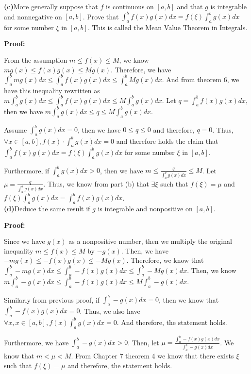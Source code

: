 \documentclass[a4paper,12pt]{report}
\begin{document}
\noindent
\textbf{(c)}More generally suppose that $f$ is continuous on $[a,b]$ and that $g$ is integrable and nonnegative on $[a,b]$. Prove that $\int_a^bf(x)g(x)dx=f(\xi)\int_a^bg(x)dx$ for some number $\xi$ in $[a,b]$. This is called the Mean Value Theorem in Integrals. 

\noindent
\textbf{Proof: }

\noindent
From the assumption $m\leq f(x)\leq M$, we know $mg(x)\leq f(x)g(x)\leq Mg(x)$. Therefore, we have $\int_a^bmg(x)dx\leq  \int_a^bf(x)g(x)dx \leq \int_a^bMg(x)dx$. And from theorem 6, we have this inequality rewritten as $m\int_a^bg(x)dx\leq  \int_a^bf(x)g(x)dx \leq M\int_a^bg(x)dx$. Let $q =\int_a^bf(x)g(x)dx$, then we have $m\int_a^bg(x)dx\leq  q \leq M\int_a^bg(x)dx$.

\noindent
Assume $\int_a^bg(x)dx=0$, then we have $0\leq q\leq 0$ and therefore, $q =0$. Thus, $\forall x \in [a,b], f(x)\cdot\int_a^bg(x)dx=0$ and therefore holds the claim that $\int_a^bf(x)g(x)dx=f(\xi)\int_a^bg(x)dx$ for some number $\xi$ in $[a,b]$.

\noindent
Furthermore, if $\int_a^bg(x)dx>0$, then we have $m\leq \frac{q}{\int_a^bg(x)dx}\leq M$. Let $\mu = \frac{q}{\int_a^bg(x)dx}$. Thus, we know from part (b) that $\exists \xi$ such that $f(\xi)=\mu$ and $f(\xi)\int_a^bg(x)dx=\int_a^bf(x)g(x)dx$.\\

\noindent
\textbf{(d)}Deduce the same result if $g$ is integrable and nonpositive on $[a,b]$.

\noindent
\textbf{Proof: }

\noindent
Since we have $g(x)$ as a nonpositive number, then we multiply the original inequality $m\leq f(x)\leq M$ by $-g(x)$. Then, we have $-mg(x)\leq -f(x)g(x)\leq -Mg(x)$. Therefore, we know that $\int_a^b-mg(x)dx\leq  \int_a^b-f(x)g(x)dx \leq \int_a^b-Mg(x)dx$. Then, we know $m\int_a^b-g(x)dx\leq  \int_a^b-f(x)g(x)dx \leq M\int_a^b-g(x)dx$. 

\noindent
Similarly from previous proof, if $\int_a^b-g(x)dx=0$, then we know that $\int_a^b-f(x)g(x)dx=0$. Thus, we also have $\forall x, x\in[a,b], f(x)\int_a^bg(x)dx=0$. And therefore, the statement holds.

\noindent
Furthermore, we have $\int_a^b-g(x)dx>0$. Then, let $\mu = \frac{\int_a^b-f(x)g(x)dx}{\int_a^b-g(x)dx}$. We know that $m< \mu <M$. From Chapter 7 theorem 4 we know that there exists $\xi$ such that $f(\xi)=\mu$ and therefore, the statement holds.\\
\end{document}
